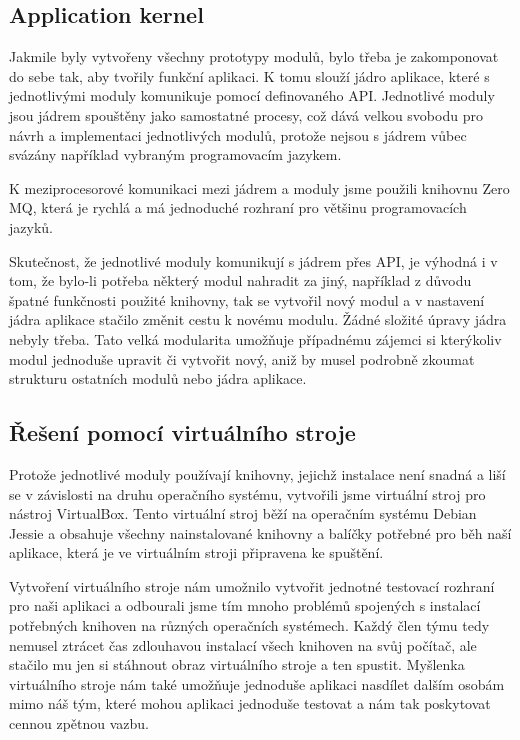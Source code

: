 \documentclass[12pt,a4paper]{article}
\begin{document}
\subsection{Application kernel}
Jakmile byly vytvořeny všechny prototypy modulů, bylo třeba je zakomponovat do sebe tak, aby tvořily funkční aplikaci. K tomu slouží jádro aplikace, které s jednotlivými moduly komunikuje pomocí definovaného API. Jednotlivé moduly jsou jádrem spouštěny jako samostatné procesy, což dává velkou svobodu pro návrh a implementaci jednotlivých modulů, protože nejsou s jádrem vůbec svázány například vybraným programovacím jazykem.

K meziprocesorové komunikaci mezi jádrem a moduly jsme použili knihovnu Zero MQ, která je rychlá a má jednoduché rozhraní pro většinu programovacích jazyků.

Skutečnost, že jednotlivé moduly komunikují s jádrem přes API, je výhodná i v tom, že bylo-li potřeba některý modul nahradit za jiný, například z důvodu špatné funkčnosti použité knihovny, tak se vytvořil nový modul a v nastavení jádra aplikace stačilo změnit cestu k novému modulu. Žádné složité úpravy jádra nebyly třeba. Tato velká modularita umožňuje případnému zájemci si kterýkoliv modul jednoduše upravit či vytvořit nový, aniž by musel podrobně zkoumat strukturu ostatních modulů nebo jádra aplikace.

\subsection{Řešení pomocí virtuálního stroje}
Protože jednotlivé moduly používají knihovny, jejichž instalace není snadná a liší se v závislosti na druhu operačního systému, vytvořili jsme virtuální stroj pro nástroj VirtualBox. Tento virtuální stroj běží na operačním systému Debian Jessie a obsahuje všechny nainstalované knihovny a balíčky potřebné pro běh naší aplikace, která je ve virtuálním stroji připravena ke spuštění. 

Vytvoření virtuálního stroje nám umožnilo vytvořit jednotné testovací rozhraní pro naši aplikaci a odbourali jsme tím mnoho problémů spojených s instalací potřebných knihoven na různých operačních systémech. Každý člen týmu tedy nemusel ztrácet čas zdlouhavou instalací všech knihoven na svůj počítač, ale stačilo mu jen si stáhnout obraz virtuálního stroje a ten spustit. Myšlenka virtuálního stroje nám také umožňuje jednoduše aplikaci nasdílet dalším osobám mimo náš tým, které mohou aplikaci jednoduše testovat a nám tak poskytovat cennou zpětnou vazbu.
\end{document}
